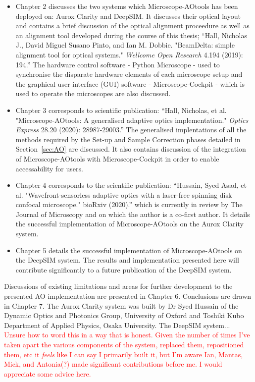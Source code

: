 \begin{itemize}
	\item Chapter 2 discusses the two systems which Microscope-AOtools has
	been deployed on: Aurox Clarity and DeepSIM. It discusses their optical 
	layout and contains a brief discussion of the optical alignment 
	proceedure as well as an alignment tool developed during the course of 
	this thesis; ``Hall, Nicholas J., David Miguel Susano Pinto, and Ian M. 
	Dobbie. "BeamDelta: simple alignment tool for optical systems." 
	\textit{Wellcome Open Research} 4.194 (2019): 194.''\cite{dobbie2019beamdelta} 
	The hardware control software - Python Microscope - used to synchronise 
	the disparate hardware elements of each microscope setup and the 
	graphical user interface (GUI) software - Microscope-Cockpit - which 
	is used to operate the microscopes are also discussed.
	\item Chapter 3 corresponds to scientific publication: ``Hall, Nicholas, 
	et al. "Microscope-AOtools: A generalised adaptive optics implementation." 
	\textit{Optics Express} 28.20 (2020): 28987-29003.''\cite{hall2020microscope}
	The generalised implentations of all the methods required by the Set-up and 
	Sample Correction phases detailed in Section~\ref{sec:AO} are discussed.
	It also contains discussion of the integration of Microscope-AOtools with
	Microscope-Cockpit in order to enable accessability for users.
	\item Chapter 4 corresponds to the scientific publication: ``Hussain, 
	Syed Asad, et al. "Wavefront-sensorless adaptive optics with a laser-free 
	spinning disk confocal microscope." bioRxiv (2020).''\cite{hussain2020sensorless} 
	which is currently in review by The Journal of Microscopy and on which 
	the author is a co-first author. It details the successful implementation 
	of Microscope-AOtools on the Aurox Clarity system.
	\item Chapter 5 details the successful implementation of Microscope-AOtools 
	on the DeepSIM system. The results and implementation presented here will
	contribute significantly to a future publication of the DeepSIM system.
\end{itemize}

Discussions of existing limitations and areas for further development to the 
presented AO implementation are presented in Chapter 6. Conclusions are drawn 
in Chapter 7. The Aurox Clarity system was built by Dr Syed Hussain of the 
Dynamic Optics and Photonics Group, University of Oxford and Toshiki Kubo
Department of Applied Physics, Osaka University. The DeepSIM system...
\textcolor{red}{Unsure how to word this in a way that is honest. Given the 
	number of times I've taken apart the various components of the system, 
	replaced them, repositioned them, etc it \textit{feels} like I can say I 
	primarily built it, but I'm aware Ian, Mantas, Mick, and Antonia(?) made 
	significant contributions before me. I would appreciate some advice here.}
